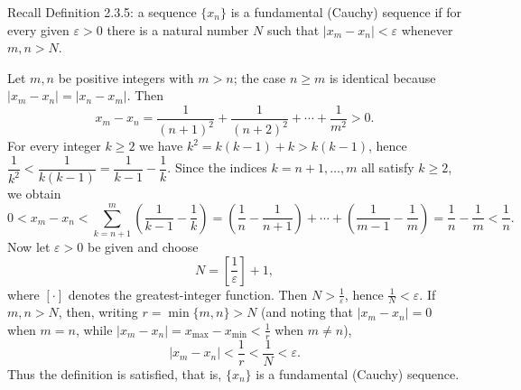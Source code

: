 \documentclass[11pt,a4paper]{article}
\newenvironment{solution}[1]{%
  \par\addvspace{1.7ex}%
  \noindent{\color{solutioncolor}\textbf{#1}}\hspace{0.55em}\ignorespaces}%
  {\par\addvspace{0.9ex}}
\begin{document}
\begin{solution}{Solution 2.3.6}\label{es:2.3.6}
Recall Definition 2.3.5: a sequence $\{x_n\}$ is a fundamental (Cauchy) sequence
if for every given $\varepsilon>0$ there is a natural number $N$ such that
$|x_m-x_n|<\varepsilon$ whenever $m,n>N$.

Let $m,n$ be positive integers with $m>n$; the case $n\ge m$ is identical because
$|x_m-x_n|=|x_n-x_m|$. Then
\[
x_m-x_n=\frac{1}{(n+1)^2}+\frac{1}{(n+2)^2}+\cdots+\frac{1}{m^2}>0 .
\]
For every integer $k\ge2$ we have $k^2=k(k-1)+k>k(k-1)$, hence
$\dfrac{1}{k^2}<\dfrac{1}{k(k-1)}=\dfrac{1}{k-1}-\dfrac{1}{k}$. Since the indices
$k=n+1,\dots,m$ all satisfy $k\ge2$, we obtain
\[
0<x_m-x_n<\sum_{k=n+1}^{m}\left(\frac{1}{k-1}-\frac{1}{k}\right)
=\left(\frac1n-\frac{1}{n+1}\right)+\cdots+\left(\frac{1}{m-1}-\frac1m\right)
=\frac1n-\frac1m<\frac1n .
\]
Now let $\varepsilon>0$ be given and choose
\[
N=\left[\frac{1}{\varepsilon}\right]+1,
\]
where $[\cdot]$ denotes the greatest-integer function. Then $N>\frac1\varepsilon$,
hence $\frac1N<\varepsilon$. If $m,n>N$, then, writing $r=\min\{m,n\}>N$ (and
noting that $|x_m-x_n|=0$ when $m=n$, while $|x_m-x_n|=x_{\max}-x_{\min}<\frac1r$
when $m\neq n$),
\[
|x_m-x_n|<\frac{1}{r}<\frac{1}{N}<\varepsilon .
\]
Thus the definition is satisfied, that is, $\{x_n\}$ is a fundamental (Cauchy)
sequence.
\end{solution}
\end{document}
